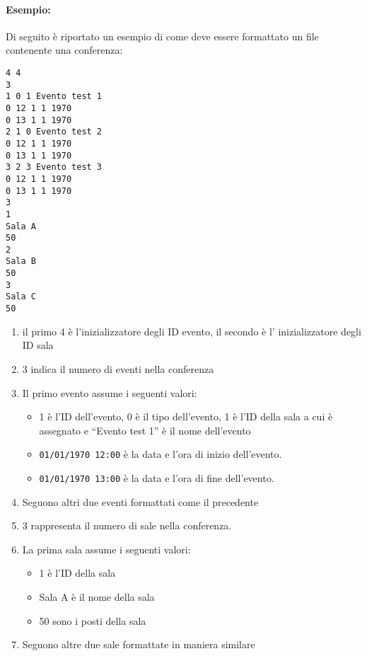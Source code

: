 \documentclass[11pt]{scrartcl} %
\begin{document}
\begin{minipage}{\linewidth}
	\paragraph{Esempio:}
	Di seguito è riportato un esempio di come deve essere formattato un file contenente una conferenza:

	\begin{lstlisting}
4 4
3
1 0 1 Evento test 1
0 12 1 1 1970
0 13 1 1 1970
2 1 0 Evento test 2
0 12 1 1 1970
0 13 1 1 1970
3 2 3 Evento test 3
0 12 1 1 1970
0 13 1 1 1970
3
1
Sala A
50
2
Sala B
50
3
Sala C
50
\end{lstlisting}

	\begin{enumerate}
		\item il primo 4 è l'inizializzatore degli ID evento, il secondo è l' inizializzatore degli ID sala
		\item 3 indica il numero di eventi nella conferenza
		\item Il primo evento assume i seguenti valori:
		      \begin{itemize}
			      \item 1 è l'ID dell'evento, 0 è il tipo dell'evento, 1 è l'ID della sala a cui è assegnato e ``Evento test 1'' è il nome dell'evento
			      \item \texttt{01/01/1970 12:00} è la data e l'ora di inizio dell'evento.
			      \item \texttt{01/01/1970 13:00} è la data e l'ora di fine dell'evento.
		      \end{itemize}
		\item Seguono altri due eventi formattati come il precedente
		\item 3 rappresenta il numero di sale nella conferenza.
		\item La prima sala assume i seguenti valori:
		      \begin{itemize}
			      \item 1 è l'ID della sala
			      \item Sala A è il nome della sala
			      \item 50 sono i posti della sala
		      \end{itemize}
		\item Seguono altre due sale formattate in maniera similare
	\end{enumerate}

\end{minipage}
\end{document}
